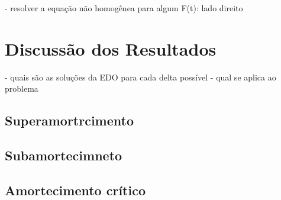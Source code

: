 \documentclass[12pt]{article}
\begin{document}
- resolver a equação não homogênea para algum F(t): lado direito

\pagebreak

\section{Discussão dos Resultados}

- quais são as soluções da EDO para cada delta possível
- qual se aplica ao problema

\subsection{Superamortrcimento}

\subsection{Subamortecimneto}

\subsection{Amortecimento crítico}


\end{document}
